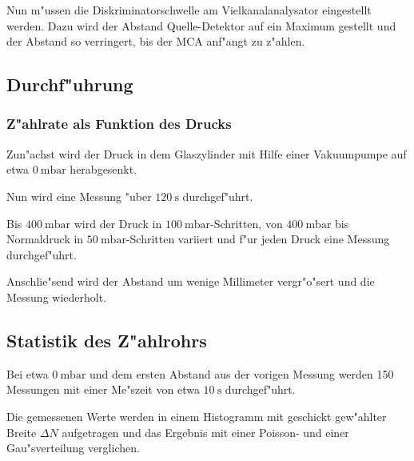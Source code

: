 	Nun m"ussen die Diskriminatorschwelle am Vielkanalanalysator eingestellt werden. Dazu wird der Abstand Quelle-Detektor auf ein Maximum gestellt und der Abstand so verringert, bis der MCA anf"angt zu z"ahlen.

	\subsection{Durchf"uhrung} %
	\label{sub:durchf_uhrung}
	

	\subsubsection{Z"ahlrate als Funktion des Drucks} %
	\label{sub:subsection_name}
	
	Zun"achst wird der Druck in dem Glaszylinder mit Hilfe einer Vakuumpumpe auf etwa $\SI{0}{\milli\bar}$ herabgesenkt.

	Nun wird eine Messung "uber $\SI{120}{\second}$ durchgef"uhrt.

	Bis $\SI{400}{\milli\bar}$ wird der Druck in $\SI{100}{\milli\bar}$-Schritten, von $\SI{400}{\milli\bar}$ bis Normaldruck in $\SI{50}{\milli\bar}$-Schritten variiert und f"ur jeden Druck eine Messung durchgef"uhrt.

	Anschlie"send wird der Abstand um wenige Millimeter vergr"o"sert und die Messung wiederholt.

	\subsection{Statistik des Z"ahlrohrs} %
	\label{sub:statistik_des_z_ahlrohrs}
	
	Bei etwa $\SI{0}{\milli\bar}$ und dem ersten Abstand aus der vorigen Messung werden 150 Messungen mit einer Me"szeit von etwa $\SI{10}{\second}$ durchgef"uhrt.

	Die gemessenen Werte werden in einem Histogramm mit geschickt gew"ahlter Breite $\Delta N$ aufgetragen und das Ergebnis mit einer Poisson- und einer Gau"sverteilung verglichen.
